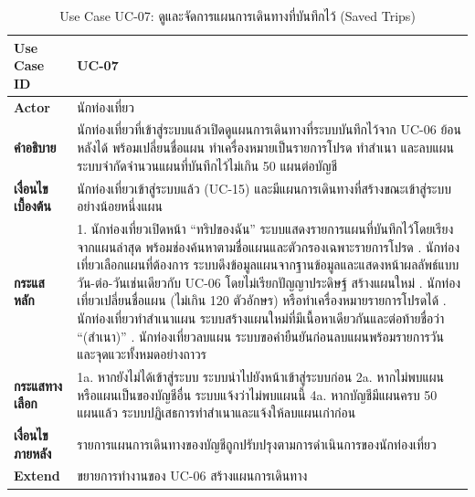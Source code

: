 \begin{table}[H]
\centering
\caption{Use Case UC-07: ดูและจัดการแผนการเดินทางที่บันทึกไว้ (Saved Trips)}
\label{tab:uc07}
\begin{tabular}{|p{3.2cm}|p{10cm}|}
\hline
\textbf{Use Case ID} & UC-07 \\ \hline
\textbf{Actor} & นักท่องเที่ยว \\ \hline
\textbf{คำอธิบาย} & นักท่องเที่ยวที่เข้าสู่ระบบแล้วเปิดดูแผนการเดินทางที่ระบบบันทึกไว้จาก UC-06 ย้อนหลังได้ พร้อมเปลี่ยนชื่อแผน ทำเครื่องหมายเป็นรายการโปรด ทำสำเนา และลบแผน ระบบจำกัดจำนวนแผนที่บันทึกไว้ไม่เกิน 50 แผนต่อบัญชี \\ \hline
\textbf{เงื่อนไขเบื้องต้น} & นักท่องเที่ยวเข้าสู่ระบบแล้ว (UC-15) และมีแผนการเดินทางที่สร้างขณะเข้าสู่ระบบอย่างน้อยหนึ่งแผน \\ \hline
\textbf{กระแสหลัก} & 1. นักท่องเที่ยวเปิดหน้า ``ทริปของฉัน'' ระบบแสดงรายการแผนที่บันทึกไว้โดยเรียงจากแผนล่าสุด พร้อมช่องค้นหาตามชื่อแผนและตัวกรองเฉพาะรายการโปรด \newline 2. นักท่องเที่ยวเลือกแผนที่ต้องการ ระบบดึงข้อมูลแผนจากฐานข้อมูลและแสดงหน้าผลลัพธ์แบบวัน-ต่อ-วันเช่นเดียวกับ UC-06 โดยไม่เรียกปัญญาประดิษฐ์ สร้างแผนใหม่ \newline 3. นักท่องเที่ยวเปลี่ยนชื่อแผน (ไม่เกิน 120 ตัวอักษร) หรือทำเครื่องหมายรายการโปรดได้ \newline 4. นักท่องเที่ยวทำสำเนาแผน ระบบสร้างแผนใหม่ที่มีเนื้อหาเดียวกันและต่อท้ายชื่อว่า ``(สำเนา)'' \newline 5. นักท่องเที่ยวลบแผน ระบบขอคำยืนยันก่อนลบแผนพร้อมรายการวันและจุดแวะทั้งหมดอย่างถาวร \\ \hline
\textbf{กระแสทางเลือก} & 1a. หากยังไม่ได้เข้าสู่ระบบ ระบบนำไปยังหน้าเข้าสู่ระบบก่อน \newline 2a. หากไม่พบแผน หรือแผนเป็นของบัญชีอื่น ระบบแจ้งว่าไม่พบแผนนี้ \newline 4a. หากบัญชีมีแผนครบ 50 แผนแล้ว ระบบปฏิเสธการทำสำเนาและแจ้งให้ลบแผนเก่าก่อน \\ \hline
\textbf{เงื่อนไขภายหลัง} & รายการแผนการเดินทางของบัญชีถูกปรับปรุงตามการดำเนินการของนักท่องเที่ยว \\ \hline
\textbf{Extend} & ขยายการทำงานของ UC-06 สร้างแผนการเดินทาง \\
\hline
\end{tabular}
\end{table}

